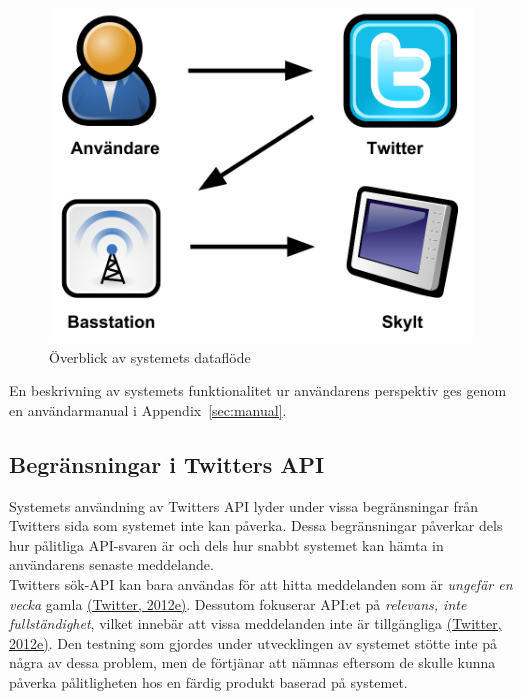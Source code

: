 \documentclass[a4paper,11pt]{article}
\begin{document}
\begin{figure}[H]
\begin{center}
\includegraphics[scale=0.3, angle=0]{system_overblick.png}
\end{center}
\caption{Överblick av systemets dataflöde}
\label{fig:sys_overblick}
\end{figure}

En beskrivning av systemets funktionalitet ur användarens perspektiv ges genom en användarmanual i Appendix~\ref{sec:manual}.

\subsection{Begränsningar i Twitters API}

Systemets användning av Twitters API lyder under vissa begränsningar från Twitters sida som systemet inte kan påverka. Dessa begränsningar påverkar dels hur pålitliga API-svaren är och dels hur snabbt systemet kan hämta in användarens senaste meddelande.\\

Twitters sök-API kan bara användas för att hitta meddelanden som är {\it ungefär en vecka} gamla \hyperref[twitter]{(Twitter, 2012e)}. Dessutom fokuserar API:et på {\it relevans, inte fullständighet}, vilket innebär att vissa meddelanden inte är tillgängliga \hyperref[twitter]{(Twitter, 2012e)}. Den testning som gjordes under utvecklingen av systemet stötte inte på några av dessa problem, men de förtjänar att nämnas eftersom de skulle kunna påverka pålitligheten hos en färdig produkt baserad på systemet.\\
\end{document}
